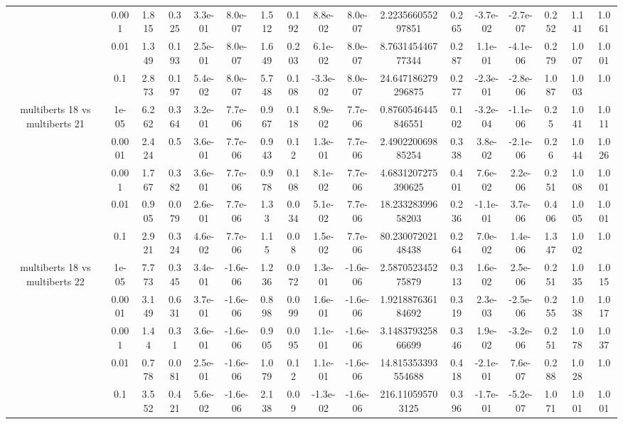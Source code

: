 \begin{tabular}{|c|c|c|c|c|c|c|c|c|c|c|c|c|c|c|c|c|}
 & 0.001 & 1.815 & 0.325 & 3.3e-01 & 8.0e-07 & 1.512 & 0.192 & 8.8e-02 & 8.0e-07 & 2.223566055297851 & 0.265 & -3.7e-02 & -2.7e-07 & 0.252 & 1.141 & 1.061 \\
 & 0.01 & 1.349 & 0.193 & 2.5e-01 & 8.0e-07 & 1.649 & 0.203 & 6.1e-02 & 8.0e-07 & 8.763145446777344 & 0.287 & 1.1e-01 & -4.1e-06 & 0.279 & 1.007 & 1.001 \\
 & 0.1 & 2.873 & 0.197 & 5.4e-02 & 8.0e-07 & 5.748 & 0.108 & -3.3e-02 & 8.0e-07 & 24.647186279296875 & 0.277 & -2.3e-01 & -2.8e-06 & 1.087 & 1.003 & 1.0 \\
\hline
\multirow{5}{*}{multiberts 18 vs multiberts 21} & 1e-05 & 6.262 & 0.364 & 3.2e-01 & 7.7e-06 & 0.967 & 0.118 & 8.9e-02 & 7.7e-06 & 0.8760546445846551 & 0.102 & -3.2e-04 & -1.1e-06 & 0.25 & 1.041 & 1.011 \\
 & 0.0001 & 2.424 & 0.5 & 3.6e-01 & 7.7e-06 & 0.943 & 0.12 & 1.3e-01 & 7.7e-06 & 2.490220069885254 & 0.338 & 3.8e-02 & -2.1e-06 & 0.26 & 1.044 & 1.026 \\
 & 0.001 & 1.767 & 0.382 & 3.6e-01 & 7.7e-06 & 0.978 & 0.108 & 8.1e-02 & 7.7e-06 & 4.6831207275390625 & 0.401 & 7.6e-02 & 2.2e-06 & 0.251 & 1.008 & 1.001 \\
 & 0.01 & 0.905 & 0.079 & 2.6e-01 & 7.7e-06 & 1.33 & 0.034 & 5.1e-02 & 7.7e-06 & 18.23328399658203 & 0.236 & -1.1e-01 & 3.7e-06 & 0.406 & 1.005 & 1.001 \\
 & 0.1 & 2.921 & 0.324 & 4.6e-02 & 7.7e-06 & 1.15 & 0.08 & 1.5e-02 & 7.7e-06 & 80.23007202148438 & 0.264 & 7.0e-02 & 1.4e-06 & 1.347 & 1.002 & 1.0 \\
\hline
\multirow{5}{*}{multiberts 18 vs multiberts 22} & 1e-05 & 7.773 & 0.345 & 3.4e-01 & -1.6e-06 & 1.236 & 0.072 & 1.3e-01 & -1.6e-06 & 2.587052345275879 & 0.313 & 1.6e-02 & 2.5e-06 & 0.251 & 1.035 & 1.015 \\
 & 0.0001 & 3.149 & 0.631 & 3.7e-01 & -1.6e-06 & 0.898 & 0.099 & 1.6e-01 & -1.6e-06 & 1.921887636184692 & 0.319 & 2.3e-03 & -2.5e-06 & 0.255 & 1.038 & 1.017 \\
 & 0.001 & 1.44 & 0.31 & 3.6e-01 & -1.6e-06 & 0.905 & 0.095 & 1.1e-01 & -1.6e-06 & 3.148379325866699 & 0.346 & 1.9e-02 & -3.2e-06 & 0.251 & 1.078 & 1.037 \\
 & 0.01 & 0.778 & 0.081 & 2.5e-01 & -1.6e-06 & 1.079 & 0.12 & 1.1e-01 & -1.6e-06 & 14.815353393554688 & 0.418 & -2.1e-01 & 7.6e-07 & 0.288 & 1.028 & 1.0 \\
 & 0.1 & 3.552 & 0.421 & 5.6e-02 & -1.6e-06 & 2.138 & 0.09 & -1.3e-02 & -1.6e-06 & 216.110595703125 & 0.396 & -1.7e-01 & -5.2e-07 & 1.071 & 1.001 & 1.001 \\

\end{tabular}
